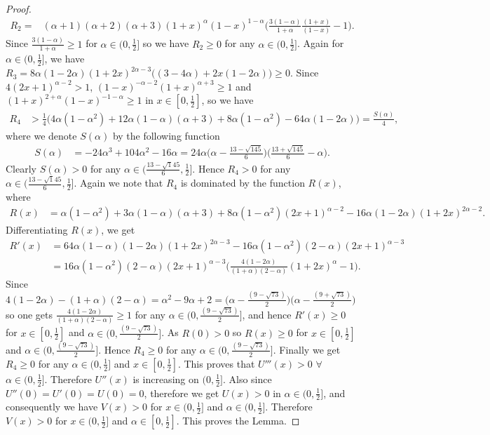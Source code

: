 \documentclass[12pt]{amsart}
\theoremstyle{definition}
\theoremstyle{plain}
\theoremstyle{definition}
\numberwithin{equation}{section}
\begin{document}
\begin{proof}
\begin{align*}
R_{2}=&(\alpha+1)(\alpha+2)(\alpha+3)(1+x)^{\alpha}(1-x)^{1-\alpha}\Big(\frac{3(1-\alpha)}{1+\alpha}\frac{(1+x)}{(1-x)}-1\Big).
\end{align*}
Since $\frac{3(1-\alpha)}{1+\alpha}\geq1$ for $\alpha\in (0, \frac{1}{2}]$ so we have $R_{2}\geq0$ for any $\alpha\in (0, \frac{1}{2}]$. Again for $\alpha\in (0, \frac{1}{2}]$, we have $R_{3}=8\alpha(1-2\alpha)(1+2x)^{2\alpha-3}\Big((3-4\alpha)+2x(1-2\alpha)\Big)\geq 0$. Since $4(2x+1)^{\alpha-2}>1$, $(1-x)^{-\alpha-2}(1+x)^{\alpha+3}\geq1$ and $(1+x)^{2+\alpha}(1-x)^{-1-\alpha}\geq1$ in $x\in[0, \frac{1}{2}]$, so we have
\begin{align*}
R_{4}&>\frac{1}{4}\Big(4\alpha(1-\alpha^{2})+12\alpha(1-\alpha)(\alpha+3)+8\alpha(1-\alpha^{2})-64\alpha(1-2\alpha)\Big)=\frac{S(\alpha)}{4},
\end{align*}where we denote $S(\alpha)$ by the following function
\begin{align*}
 S(\alpha)&=-24\alpha^{3}+104\alpha^{2}-16\alpha=24\alpha\Big(\alpha-\frac{13-\sqrt{145}}{6}\Big)\Big(\frac{13+\sqrt{145}}{6}-\alpha\Big).
\end{align*}
Clearly $S(\alpha)>0$ for any $\alpha\in(\frac{13-\sqrt145}{6}, \frac{1}{2}]$. Hence $R_{4}>0$ for any $\alpha\in(\frac{13-\sqrt145}{6},\frac{1}{2}]$. Again we note that $R_{4}$ is dominated by the function $R(x)$, where
\begin{align*}
R(x)&=\alpha(1-\alpha^{2})+3\alpha(1-\alpha)(\alpha+3)+8\alpha(1-\alpha^{2})(2x+1)^{\alpha-2}-16\alpha(1-2\alpha)(1+2x)^{2\alpha-2}.
\end{align*} Differentiating $R(x)$, we get
\begin{align*}
R'(x)&=64\alpha(1-\alpha)(1-2\alpha)(1+2x)^{2\alpha-3}-16\alpha(1-\alpha^{2})(2-\alpha)(2x+1)^{\alpha-3}\\
&=16\alpha(1-\alpha^{2})(2-\alpha)(2x+1)^{\alpha-3}\Big(\frac{4(1-2\alpha)}{(1+\alpha)(2-\alpha)}(1+2x)^{\alpha}-1\Big).
\end{align*} Since $4(1-2\alpha)-(1+\alpha)(2-\alpha)=\alpha^{2}-9\alpha+2=\Big(\alpha-\frac{(9-\sqrt{73})}{2}\Big)\Big(\alpha-\frac{(9+\sqrt{73})}{2}\Big)$ so one gets $\frac{4(1-2\alpha)}{(1+\alpha)(2-\alpha)}\geq1$ for any $\alpha\in(0, \frac{(9-\sqrt{73})}{2}]$, and hence $R'(x)\geq0$ for $x\in[0, \frac{1}{2}]$ and $\alpha\in(0, \frac{(9-\sqrt{73})}{2}]$. As $R(0)>0$ so $R(x)\geq0$ for $x\in[0, \frac{1}{2}]$ and $\alpha\in(0, \frac{(9-\sqrt{73})}{2}]$. Hence $R_{4}\geq 0$ for any $\alpha\in(0, \frac{(9-\sqrt{73})}{2}]$. Finally we get $R_{4}\geq 0$ for any $\alpha\in(0, \frac{1}{2}]$ and $x\in[0, \frac{1}{2}]$. This proves that $U'''(x)>0$ $\forall$ $\alpha\in(0,\frac{1}{2}]$.
Therefore $U''(x)$ is increasing on $(0, \frac{1}{2}]$. Also since $U''(0)=U'(0)=U(0)=0$, therefore we get $U(x)>0$ in $\alpha\in(0,\frac{1}{2}]$, and consequently we have $V(x)>0$ for $x\in(0, \frac{1}{2}]$ and $\alpha\in(0,\frac{1}{2}]$. Therefore $V(x)>0$ for $x\in(0, \frac{1}{2}]$ and $\alpha\in[0, \frac{1}{2}]$. This proves the Lemma.
\end{proof}
\end{document}
